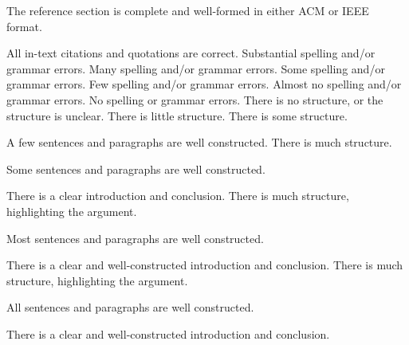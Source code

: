 \documentclass{../../../fal_assignment}
\begin{document}
\begin{markingrubric}
        \par 		The reference section is complete and well-formed in either ACM or IEEE format.
        \par 		All in-text citations and quotations are correct.
%
        \grade\fail 	Substantial spelling and/or grammar errors.
        \grade 		Many spelling and/or grammar errors.
        \grade 		Some spelling and/or grammar errors.  
        \grade 		Few spelling and/or grammar errors.
        \grade 		Almost no spelling and/or grammar errors.
        \grade 		No spelling or grammar errors.
%
        \grade\fail 	There is no structure, or the structure is unclear.
        \grade 		There is little structure.
        \grade 		There is some structure.
        \par 		A few sentences and paragraphs are well constructed.
        \grade 		There is much structure.
        \par 		Some sentences and paragraphs are well constructed.
        \par 		There is a clear introduction and conclusion.
        \grade 		There is much structure, highlighting the argument.
        \par 		Most sentences and paragraphs are well constructed.
        \par 		There is a clear and well-constructed introduction and conclusion.
        \grade 		There is much structure, highlighting the argument.
        \par 		All sentences and paragraphs are well constructed.
        \par 		There is a clear and well-constructed introduction and conclusion.
\end{markingrubric}
\end{document}
